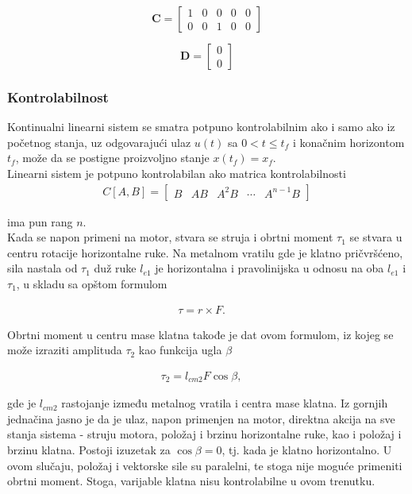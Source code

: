 \documentclass[a4paper,11pt]{article}
\theoremstyle{definition} \newtheorem{deff}{Definicija}[section]
\theoremstyle{definition} \newtheorem{prim}[deff]{Primer}
\theoremstyle{plain} \newtheorem{teor}[deff]{Teorema}
\begin{document}
	\[
	\mathbf{C} =
	\begin{bmatrix}
		1 & 0 & 0 & 0 & 0 \\
		0 & 0 & 1 & 0 & 0
	\end{bmatrix}
	\]
	
	\[
	\mathbf{D} =
	\begin{bmatrix}
		0 \\
		0
	\end{bmatrix}
	\]
	
	
	\subsubsection{Kontrolabilnost}
	
	Kontinualni linearni sistem se smatra potpuno kontrolabilnim ako i samo ako iz početnog stanja, uz odgovarajući ulaz $u(t)$ sa $0 < t \leq t_f$ i konačnim horizontom $t_f$, može da se postigne
	proizvoljno stanje $x(t_f) = x_f$. \\
	
	Linearni sistem je potpuno kontrolabilan ako matrica kontrolabilnosti
	\begin{align}
		C[A, B] = \begin{bmatrix}
			B & AB & A^2B & \cdots & A^{n-1}B
		\end{bmatrix} 
	\end{align}
	
	ima pun rang $n$. \\
	
	Kada se napon primeni na motor, stvara se struja i obrtni moment $\tau_1$ se stvara u centru rotacije horizontalne ruke. Na metalnom vratilu gde je klatno pričvršćeno, sila nastala od $\tau_1$ duž ruke $l_{e1}$ je horizontalna i pravolinijska u odnosu na oba $l_{e1}$ i $\tau_1$, u skladu sa opštom formulom
	
	\begin{align}
		\tau = r \times F. \quad 
	\end{align}
	
	Obrtni moment u centru mase klatna takođe je dat ovom formulom, iz kojeg se može izraziti amplituda $\tau_2$ kao funkcija ugla $\beta$
	
	\begin{align}
		\tau_2 = l_{cm2} F \cos \beta, \quad
	\end{align}
	
	
	gde je $l_{cm2}$ rastojanje između metalnog vratila i centra mase klatna. Iz gornjih jednačina jasno je da je ulaz, napon primenjen na motor, direktna akcija na sve stanja sistema - struju motora, položaj i brzinu horizontalne ruke, kao i položaj i brzinu klatna. Postoji izuzetak za $\cos \beta = 0$, tj. kada je klatno horizontalno. U ovom slučaju, položaj i vektorske sile su paralelni, te stoga nije moguće primeniti obrtni moment. Stoga, varijable klatna nisu kontrolabilne u ovom trenutku.
	
\end{document}
